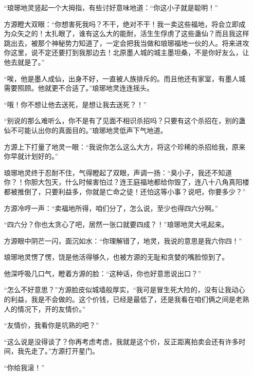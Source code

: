 \begin{this_body}
“琅琊地灵竖起一个大拇指，有些讨好意味地道：“你这小子就是聪明！”

方源瞪大双眼：“你想害死我吗？不干，绝对不干！我一卖这些福地，将会立即成为众矢之的！太扎眼了，谁有这么大的能耐，活生生俘虏了这些蛊仙？而且我这样跳出去，被那个神秘势力知道了，一定会把我当做和琅琊福地一伙的人。将来进攻你这里，说不定还要打到我那边去！北原墨人城的城主墨坦桑，不是你好友么，让他去就是了。”

“唉，他是墨人成仙，出身不好，一直被人族排斥的。而且他还有家室，有墨人城需要照顾。他就更不合适了。”琅琊地灵连连摇头。

“哦！你不想让他去送死，是想让我去送死？！”

“别说的那么难听么，你不是有了见面不相识杀招吗？只要有这个杀招在，别的蛊仙不可能认出你的真面目的。”琅琊地灵低声下气地道。

方源上下打量了地灵一眼：“我说你怎么这么大方，将这个珍稀的杀招给我，原来你早就计划好的。”

琅琊地灵终于忍耐不住，气得瞪起了双眼，声调一扬：“臭小子，我还不知道你？！你胆大包天，什么时候害怕过？连王庭福地都给你毁了，连八十八角真阳楼都被推倒了，只要利益多，你就是亡命之徒！还怕这等小事？说吧，你要多少？”

方源冷哼一声：“卖福地所得，咱们分了，怎么说，至少也得四六分啊。”

“四六分？你也太贪心了吧，居然一张口就要四成？！”琅琊地灵大吼起来。

方源眼中阴芒一闪，面沉如水：“你理解错了，地灵，我说的意思是我六你四！”

琅琊地灵愣了愣，饶是他活得够久，也被方源的无耻和贪婪的嘴脸惊到了。

他深呼吸几口气，瞪着方源的脸：“这种话，你也好意思说出口？”

“怎么不好意思？”方源脸皮似城墙般厚实，“我可是冒生死大险的，没有让我动心的利益，我是不会做的。这个价钱，已经是最低了，还是我看在咱们俩之间是老熟人的情况下，开的友情价。”

“友情价，我看你是坑熟的吧？”

“这么说是没得谈了？你再考虑考虑，我就是这个价，反正距离拍卖会还有许多时间，我先走了。”方源打开星门。

“你给我滚！”

\end{this_body}

